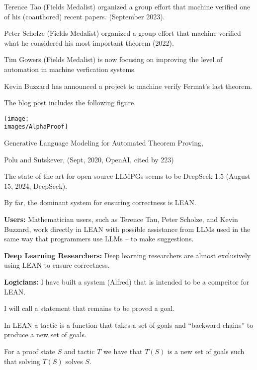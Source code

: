 {

Terence Tao (Fields Medalist) organized a group effort that machine verified one of his (coauthored) recent papers. (September 2023).

\vfill
Peter Scholze (Fields Medalist) organized a group effort that machine verified what he considered his most important theorem (2022).

\vfill
Tim Gowers (Fields Medalist) is now focusing on improving the level of automation in machine verfication systems.

\vfill
Kevin Buzzard has announced a project to machine verify Fermat's last theorem.


The blog post includes the following figure.

\centerline{\texttt{[image: \\images/AlphaProof]}}


\centerline{Generative Language Modeling for Automated Theorem Proving,}
\centerline{Polu and Sutskever, (Sept, 2020, OpenAI, cited by 223)}

\vfill
The state of the art for open source LLMPGs seems to be DeepSeek 1.5 (August 15, 2024, DeepSeek).


By far, the dominant system for ensuring correctness is LEAN.

\vfill
{\bf Users:} Mathematician users, such as Terence Tau, Peter Scholze, and Kevin Buzzard, work directly in LEAN with possible assistance
from LLMs used in the same way that programmers use LLMs -- to make suggestions.

\vfill
{\bf Deep Learning Researchers:} Deep learning researchers are almost exclusively using LEAN to ensure correctness.

\vfill
{\bf Logicians:} I have built a system (Alfred) that is intended to be a compeitor for LEAN.


I will call a statement that remains to be proved a goal.

\vfill
In LEAN a tactic is a function that takes a set of goals and ``backward chains'' to produce a new set of goals.

\vfill
For a proof state $S$ and tactic $T$ we have that $T(S)$ is a new set of goals such that solving $T(S)$ solves $S$.

}
